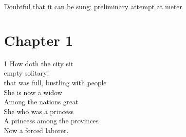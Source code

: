 \documentclass{article}
\begin{document}
\noindent Doubtful that it can be sung; preliminary attempt at meter

\section*{Chapter 1}

1 How doth the city sit\\
empty solitary;\\
that was full, bustling with people\\
She is now a widow\\

\noindent Among the nations great\\
She who was a princess\\
A princess among the provinces\\
Now a forced laborer.\\
\end{document}
